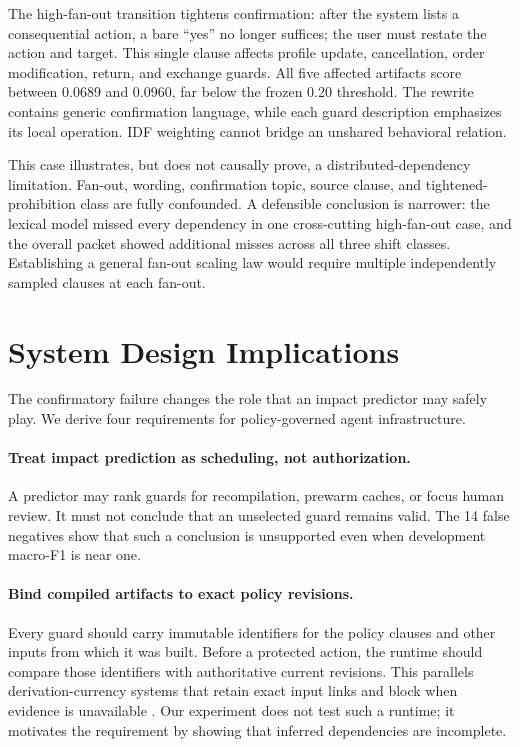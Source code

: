 \documentclass{article}
\begin{document}
The high-fan-out transition tightens confirmation: after the system lists a consequential action, a bare ``yes'' no longer suffices; the user must restate the action and target. This single clause affects profile update, cancellation, order modification, return, and exchange guards. All five affected artifacts score between 0.0689 and 0.0960, far below the frozen 0.20 threshold. The rewrite contains generic confirmation language, while each guard description emphasizes its local operation. IDF weighting cannot bridge an unshared behavioral relation.

This case illustrates, but does not causally prove, a distributed-dependency limitation. Fan-out, wording, confirmation topic, source clause, and tightened-prohibition class are fully confounded. A defensible conclusion is narrower: the lexical model missed every dependency in one cross-cutting high-fan-out case, and the overall packet showed additional misses across all three shift classes. Establishing a general fan-out scaling law would require multiple independently sampled clauses at each fan-out.

\section{System Design Implications}

The confirmatory failure changes the role that an impact predictor may safely play. We derive four requirements for policy-governed agent infrastructure.

\paragraph{Treat impact prediction as scheduling, not authorization.} A predictor may rank guards for recompilation, prewarm caches, or focus human review. It must not conclude that an unselected guard remains valid. The 14 false negatives show that such a conclusion is unsupported even when development macro-F1 is near one.

\paragraph{Bind compiled artifacts to exact policy revisions.} Every guard should carry immutable identifiers for the policy clauses and other inputs from which it was built. Before a protected action, the runtime should compare those identifiers with authoritative current revisions. This parallels derivation-currency systems that retain exact input links and block when evidence is unavailable \cite{chen2026planfence}. Our experiment does not test such a runtime; it motivates the requirement by showing that inferred dependencies are incomplete.
\end{document}
